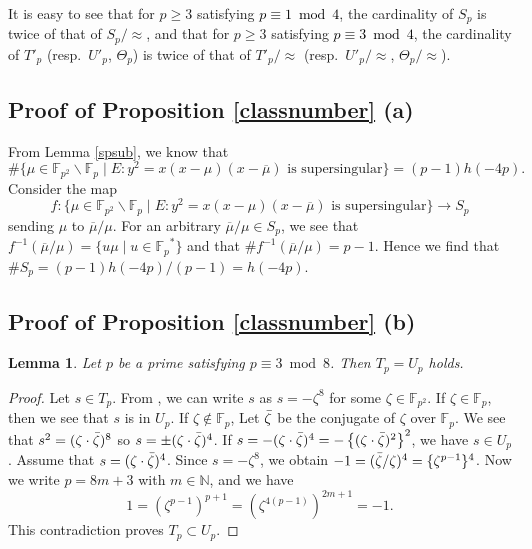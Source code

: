 \documentclass[a4paper, 11pt]{article}
\theoremstyle{plain}
\newtheorem{lem}[defn]{Lemma}
\newcommand{\?}{\textcolor{red}{??}}
\newcommand{\fp}{\mathbb{F}_p}
\newcommand{\fpp}{\mathbb{F}_{p^2}}
\begin{document}

It is easy to see that for $p \ge 3$ satisfying \textcolor{black}{$p \equiv 1 \bmod 4$}, the cardinality of $S_p$ is twice of that of $S_p/\approx$, and that for $p \ge 3$ satisfying \textcolor{black}{ $p \equiv 3 \bmod 4$}, the cardinality of $T'_p$ (resp.\ $U'_p$, $\Theta_p$) is twice of that of $T'_p/\approx$ (resp.\ $U'_p/\approx$, $\Theta_p/\approx$). 




\subsection{Proof of Proposition {\ref{classnumber}} (a)}
\label{kakkoitinituite}
From Lemma \ref{spsub}, we know that 
 \[
 \#\{\mu \in \fpp \smallsetminus \fp \mid E:y^2=x(x-\mu)(x-\overline{\mu}) \text{ is supersingular} \}=(p-1)h(-4p).
 \]
 Consider the map
 \[
  f: \{\mu \in \fpp \smallsetminus \fp \mid E:y^2=x(x-\mu)(x-\overline{\mu}) \text{ is supersingular} \} \longrightarrow S_p
 \]
 sending $\mu$ to $\overline{\mu}/\mu$.
 For an arbitrary $\overline{\mu}/\mu \in S_p$, we see that ${f}^{-1}(\overline{\mu}/\mu)=\{u\mu \mid u \in {\fp}^{*} \}$ and that $\#{f}^{-1}(\overline{\mu}/\mu)=p-1$.
Hence we find that $\# S_p=(p-1)h(-4p)/(p-1)=h(-4p)$.


\subsection{Proof of Proposition {\ref{classnumber}} (b)}
\begin{lem}
\label{tpup}
    Let $p$ be a prime satisfying $p \equiv3 \bmod 8$. Then $T_p=U_p$ holds.
\end{lem}
\begin{proof}
   Let $s \in T_p$. From \cite[Proposition 3.1]{AT02}, we can write $s$ as $s=-{\zeta}^8$ for some $\zeta \in \fpp$. If $\zeta \in \fp$, then we see that $s$ is in $U_p$. If $\zeta \notin \fp$, Let $\Bar{\zeta}$ be the conjugate of $\zeta$ over $\fp$. We see that
    $
    s^2=( \zeta\cdot\Bar{\zeta} )^8 $ so $ s=\pm(\zeta\cdot\Bar{\zeta})^4$.
 If $s=-(\zeta\cdot\Bar{\zeta})^4=-\left\{ (\zeta\cdot\Bar{\zeta})^2\right\}^2$, we have $s \in U_p$. Assume that $s=(\zeta\cdot\Bar{\zeta})^4$. Since $s=-{\zeta}^8$, we obtain $-1=(\Bar{\zeta}/\zeta)^4=\{{\zeta}^{p-1}\}^4$. Now we write $p=8m+3$ with $m \in \mathbb{N}$, and we have
    \[
   1= \left({\zeta}^{p-1} \right)^{p+1}= \left({\zeta}^{4(p-1)} \right)^{ 2m+1}=-1.
    \]
    This contradiction proves $T_p \subset U_p$. 
\end{proof}
\end{document}
